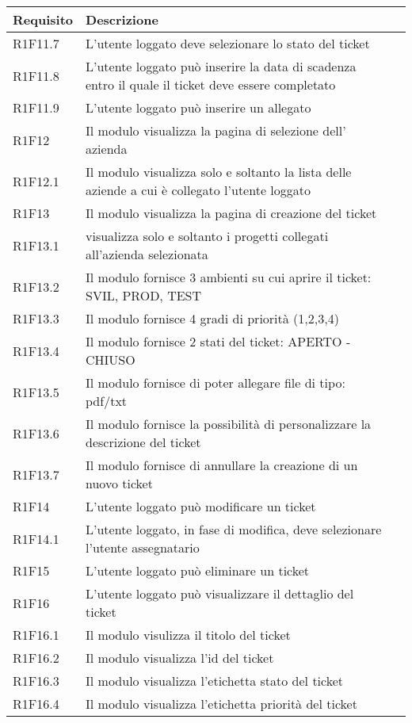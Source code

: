 \begin{table}[H]
{\renewcommand{\arraystretch}{2}%
\begin{tabularx}{\textwidth}{lXl}
\hline\hline
\textbf{Requisito} & \textbf{Descrizione}\\

\hline
R1F11.7 & L'utente loggato deve selezionare lo stato del ticket\\
\hline
R1F11.8 & L'utente loggato può inserire la data di scadenza entro il quale il ticket deve essere completato\\
\hline
R1F11.9 & L'utente loggato può inserire un allegato\\
\hline
R1F12 & Il modulo visualizza la pagina di selezione dell' azienda \\
\hline
R1F12.1 & Il modulo visualizza solo e soltanto la lista delle aziende a cui è collegato l'utente loggato \\
\hline
R1F13 & Il modulo visualizza la pagina di creazione del ticket\\
R1F13.1 & visualizza solo e soltanto i progetti collegati all'azienda selezionata\\
\hline
R1F13.2 & Il modulo fornisce 3 ambienti su cui aprire il ticket: SVIL, PROD, TEST\\
\hline
R1F13.3 & Il modulo fornisce 4 gradi di priorità (1,2,3,4)\\
\hline
R1F13.4 & Il modulo fornisce 2 stati del ticket: APERTO - CHIUSO\\
\hline
R1F13.5 & Il modulo fornisce di poter allegare file di tipo: pdf/txt\\
\hline
R1F13.6 & Il modulo fornisce la possibilità di personalizzare la descrizione del ticket\\
\hline
R1F13.7 & Il modulo fornisce di annullare la creazione di un nuovo ticket\\
\hline
R1F14 & L'utente loggato può modificare un ticket\\
\hline
R1F14.1 & L'utente loggato, in fase di modifica, deve selezionare l'utente assegnatario\\
\hline
R1F15 & L'utente loggato può eliminare un ticket\\
\hline
R1F16 & L'utente loggato può visualizzare il dettaglio del ticket\\
\hline
R1F16.1 & Il modulo visulizza il titolo del ticket\\
\hline
R1F16.2 & Il modulo visualizza l'id del ticket\\
\hline
R1F16.3 & Il modulo visualizza l'etichetta stato del ticket\\
\hline
R1F16.4 & Il modulo visualizza l'etichetta priorità del ticket\\
\hline


\end{tabularx}
}
\end{table}

